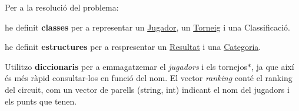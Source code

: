Per a la resolució del problema\+:
\begin{DoxyItemize}
\item he definit {\bfseries{classes}} per a representar un \mbox{\hyperlink{class_jugador}{Jugador}}, un \mbox{\hyperlink{class_torneig}{Torneig}} i una Classificació.
\item he definit {\bfseries{estructures}} per a respresentar un \mbox{\hyperlink{struct_resultat}{Resultat}} i una \mbox{\hyperlink{struct_categoria}{Categoria}}.
\end{DoxyItemize}

Utilitzo {\bfseries{diccionaris}} per a emmagatzemar el {\itshape jugadors} i els tornejos$\ast$, ja que així és més ràpid consultar-\/los en funció del nom. El vector {\itshape ranking} conté el ranking del circuit, com un vector de parells (string, int) indicant el nom del jugadors i els punts que tenen. 